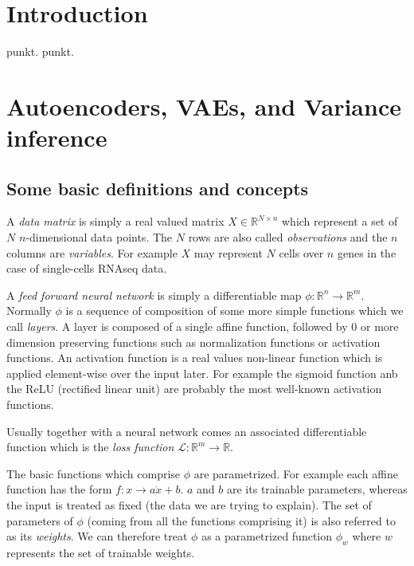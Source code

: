 \documentclass[11pt, a4paper]{report}
\theoremstyle{plain}
\theoremstyle{definition}
\newtheorem{mydef}{Definition}[chapter]
\theoremstyle{remark}
\newcommand{\R}{\mathbb{R}}
\begin{document}
\listoftables

\listoffigures

\tableofcontents

\chapter{Introduction}
punkt.
punkt.

\chapter{Autoencoders, VAEs, and Variance inference}

\section{Some basic definitions and concepts}
A \textit{data matrix} is simply a real valued matrix $X \in \R^{N \times n}$
which represent a set of $N$ $n$-dimensional data points.
The $N$ rows are also called \textit{observations} and the $n$ columns are
\textit{variables}.
For example $X$ may represent $N$ cells over $n$ genes in the case of
single-cells RNAseq data.

A \textit{feed forward neural network} is simply a differentiable map $\phi :
\R^n \to \R^m$.
Normally $\phi$ is a sequence of composition of some more simple functions which
we call \textit{layers}. A layer is composed of a single affine function,
followed by $0$ or more dimension preserving functions such as normalization
functions or activation functions. An activation function is a real values
non-linear function which is applied element-wise over the input later.
For example the sigmoid function anb the ReLU (rectified linear unit) are
probably the most well-known activation functions.


Usually together with a neural network comes an associated differentiable
function which is the \textit{loss function} $\mathcal{L} : \R^m \to \R$.

The basic functions which comprise $\phi$ are parametrized. For example each
affine function has the form $f:x \to a\dot x + b$. $a$ and $b$ are its
trainable parameters, whereas the input is treated as fixed (the data we are
trying to explain). The set of parameters of $\phi$ (coming from all the
functions comprising it) is also referred to as its \textit{weights}. We can
therefore treat $\phi$ as a parametrized function $\phi_w$ where $w$ represents
the set of trainable weights.
\end{document}
